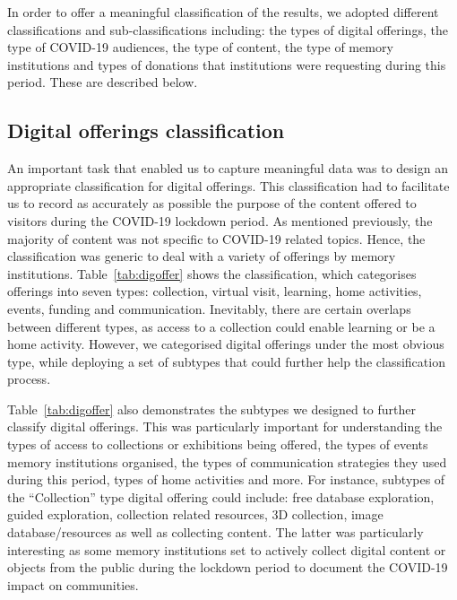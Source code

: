 \documentclass{egpubl}
\begin{document}

In order to offer a meaningful classification of the results, we adopted different classifications and sub-classifications including: the types of digital offerings, the type of COVID-19 audiences, the type of content, the type of memory institutions and types of donations that institutions were requesting during this period. These are described below.

\subsection{Digital offerings classification}
\label{off}
An important task that enabled us to capture meaningful data was to design an appropriate classification for digital offerings. This classification had to facilitate us to record as accurately as possible the purpose of the content offered to visitors during the COVID-19 lockdown period. As mentioned previously, the majority of content was not specific to COVID-19 related topics. Hence, the classification was generic to deal with a variety of offerings by memory institutions. Table~\ref{tab:digoffer} shows the classification, which categorises offerings into seven types: collection, virtual visit, learning, home activities, events, funding and communication. Inevitably, there are certain overlaps between different types, as access to a collection could enable learning or be a home activity. However, we categorised digital offerings %
under the most obvious type, while deploying a set of subtypes that could further help the classification process.

Table~\ref{tab:digoffer} also demonstrates the subtypes we designed to further classify digital offerings. This was particularly important for understanding the types of access to collections or exhibitions being offered, the types of events memory institutions organised, the types of communication strategies they used during this period, types of home activities and more. For instance, subtypes of the ``Collection'' type digital offering could include: free database exploration, guided exploration, collection related resources, 3D collection, image database/resources as well as collecting content. The latter was particularly interesting as some memory institutions set to actively collect digital content or objects from the public during the lockdown period to document the COVID-19 impact on communities.
\end{document}
